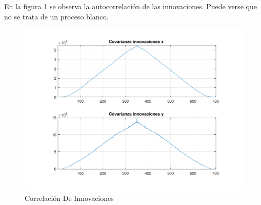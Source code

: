 	En la figura \ref{fig:ej3f_cov} se observa la autocorrelación de las innovaciones. Puede verse que no se trata de un proceso blanco.

	\begin{figure}[H]
		\centering
		\includegraphics[width=1.0\textwidth,keepaspectratio]{Figuras/covinn_ej4f.pdf}
		\caption{Correlación De Innovaciones}
		\label{fig:ej3f_cov}
	\end{figure}

